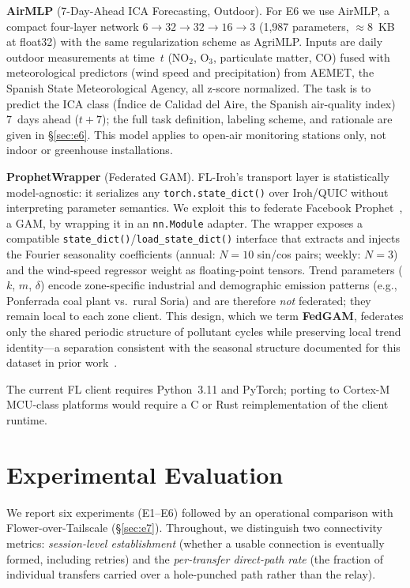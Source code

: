 \documentclass[a4paper,fleqn]{cas-dc}
\begin{document}
\textbf{AirMLP} (7-Day-Ahead ICA Forecasting, Outdoor). For E6 we use AirMLP, a compact four-layer network $6 \to 32 \to 32 \to 16 \to 3$ (1{,}987 parameters, $\approx$8~KB at float32) with the same regularization scheme as AgriMLP. Inputs are daily outdoor measurements at time~$t$ (NO$_2$, O$_3$, particulate matter, CO) fused with meteorological predictors (wind speed and precipitation) from AEMET, the Spanish State Meteorological Agency, all z-score normalized. The task is to predict the ICA class (\'Indice de Calidad del Aire, the Spanish air-quality index) 7~days ahead ($t{+}7$); the full task definition, labeling scheme, and rationale are given in \S\ref{sec:e6}. This model applies to open-air monitoring stations only, not indoor or greenhouse installations.

\textbf{ProphetWrapper} (Federated GAM). FL-Iroh's transport layer is statistically model-agnostic: it serializes any \texttt{torch.state\_dict()} over Iroh/QUIC without interpreting parameter semantics. We exploit this to federate Facebook Prophet~\cite{taylor2018prophet}, a GAM, by wrapping it in an \texttt{nn.Module} adapter. The wrapper exposes a compatible \texttt{state\_dict()}/\texttt{load\_state\_dict()} interface that extracts and injects the Fourier seasonality coefficients (annual: $N{=}10$ sin/cos pairs; weekly: $N{=}3$) and the wind-speed regressor weight as floating-point tensors. Trend parameters ($k$, $m$, $\delta$) encode zone-specific industrial and demographic emission patterns (e.g., Ponferrada coal plant vs.\ rural Soria) and are therefore \emph{not} federated; they remain local to each zone client. This design, which we term \textbf{FedGAM}, federates only the shared periodic structure of pollutant cycles while preserving local trend identity---a separation consistent with the seasonal structure documented for this dataset in prior work~\cite{lopezblanco2024airquality}.

The current FL client requires Python~3.11 and PyTorch; porting to Cortex-M MCU-class platforms would require a C or Rust reimplementation of the client runtime.

\section{Experimental Evaluation}
\label{sec:evaluation}

We report six experiments (E1--E6) followed by an operational comparison with Flower-over-Tailscale (\S\ref{sec:e7}). Throughout, we distinguish two connectivity metrics: \emph{session-level establishment} (whether a usable connection is eventually formed, including retries) and the \emph{per-transfer direct-path rate} (the fraction of individual transfers carried over a hole-punched path rather than the relay).
\end{document}
